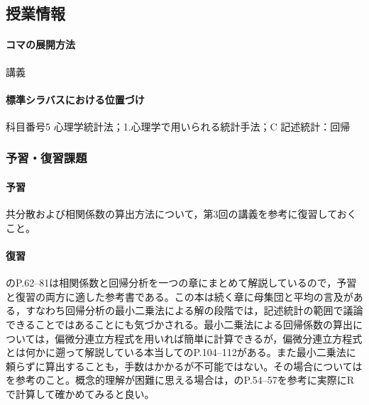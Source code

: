 \subsection{授業情報}
\paragraph{コマの展開方法}
講義
\paragraph{標準シラバスにおける位置づけ}
科目番号5 心理学統計法；1.心理学で用いられる統計手法；C 記述統計：回帰
\subsubsection{予習・復習課題}
\paragraph{予習}
共分散および相関係数の算出方法について，第3回の講義を参考に復習しておくこと。
\paragraph{復習}
\citet{山内201001}のP.62--81は相関係数と回帰分析を一つの章にまとめて解説しているので，予習と復習の両方に適した参考書である。この本は続く章に母集団と平均の言及がある，すなわち回帰分析の最小二乗法による解の段階では，記述統計の範囲で議論できることではあることにも気づかされる。最小二乗法による回帰係数の算出については，偏微分連立方程式を用いれば簡単に計算できるが，偏微分連立方程式とは何かに遡って解説している本当して\citet{kosugi2018}のP.104--112がある。また最小二乗法に頼らずに算出することも，手数はかかるが不可能ではない。その場合については\citet{西内201712}を参考のこと。概念的理解が困難に思える場合は，\citet{kosugi2018}のP.54--57を参考に実際にRで計算して確かめてみると良い。
